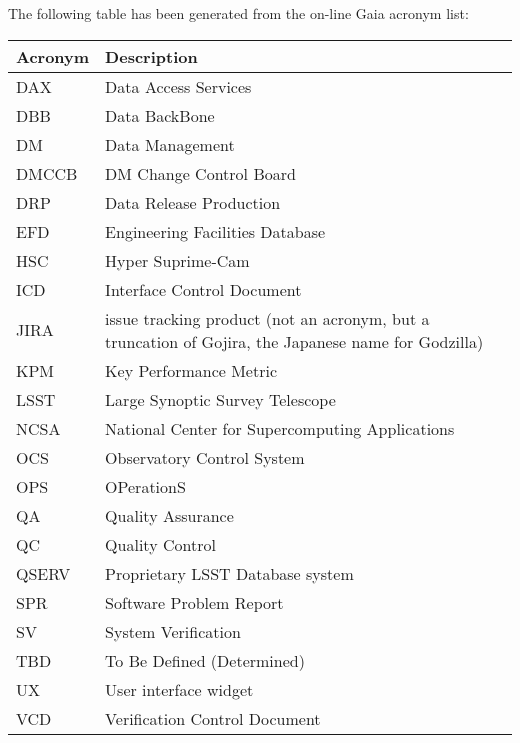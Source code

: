 The following table has been generated from the on-line Gaia acronym list:
\newline\newline%
\addtocounter{table}{-1}
\begin{longtable}{|l|p{}|}\hline 
\textbf{Acronym} & \textbf{Description}  \\\hline
DAX&Data Access Services \\\hline
DBB&Data BackBone \\\hline
DM&Data Management \\\hline
DMCCB&DM Change Control Board \\\hline
DRP&Data Release Production \\\hline
EFD&Engineering Facilities Database \\\hline
HSC&Hyper Suprime-Cam \\\hline
ICD&Interface Control Document \\\hline
JIRA&issue tracking product (not an acronym, but a truncation of Gojira, the Japanese name for Godzilla) \\\hline
KPM&Key Performance Metric \\\hline
LSST&Large Synoptic Survey Telescope \\\hline
NCSA&National Center for Supercomputing Applications \\\hline
OCS&Observatory Control System \\\hline
OPS&OPerationS \\\hline
QA&Quality Assurance \\\hline
QC&Quality Control \\\hline
QSERV&Proprietary LSST Database system \\\hline
SPR&Software Problem Report \\\hline
SV&System Verification \\\hline
TBD&To Be Defined (Determined) \\\hline
UX&User interface widget \\\hline
VCD&Verification Control Document \\\hline
\end{longtable} 
